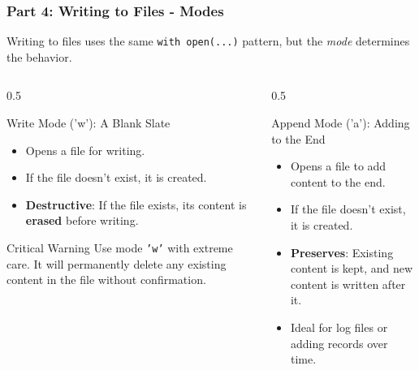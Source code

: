 \documentclass{beamer}
\begin{document}
\begin{frame}[fragile]
    \frametitle{Part 4: Writing to Files - Modes}
    Writing to files uses the same \texttt{with open(...)} pattern, but the \textit{mode} determines the behavior.

    \begin{columns}[T] %
        \begin{column}{0.5\textwidth}
            \begin{block}{Write Mode ('w'): A Blank Slate}
                \begin{itemize}
                    \item Opens a file for writing.
                    \item If the file doesn't exist, it is created.
                    \item \textbf{Destructive}: If the file exists, its content is \textbf{erased} before writing.
                \end{itemize}
                \begin{alertblock}{Critical Warning}
                    Use mode \texttt{'w'} with extreme care. It will permanently delete any existing content in the file without confirmation.
                \end{alertblock}
            \end{block}
        \end{column}

        \begin{column}{0.5\textwidth}
            \begin{block}{Append Mode ('a'): Adding to the End}
                \begin{itemize}
                    \item Opens a file to add content to the end.
                    \item If the file doesn't exist, it is created.
                    \item \textbf{Preserves}: Existing content is kept, and new content is written after it.
                    \item Ideal for log files or adding records over time.
                \end{itemize}
            \end{block}
        \end{column}
    \end{columns}
\end{frame}
\end{document}

